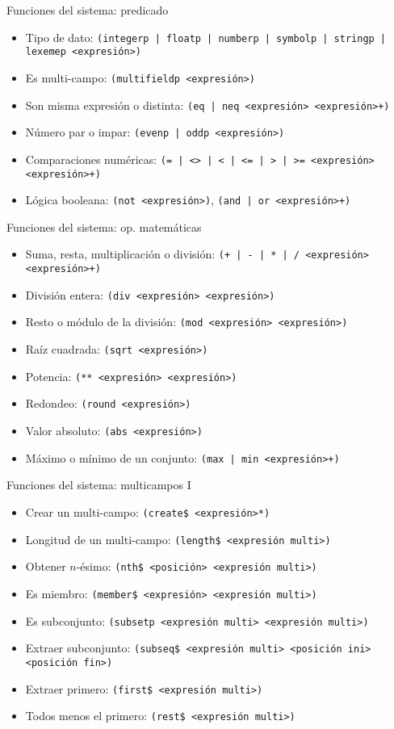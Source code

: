 \documentclass[usenames,dvipsnames,aspectratio=169]{beamer}
\begin{document}
\begin{frame}{Funciones del sistema: predicado}
	\begin{itemize}
		\item Tipo de dato: \texttt{(integerp | floatp | numberp | symbolp | stringp | lexemep <expresión>)}
		\item Es multi-campo: \texttt{(multifieldp <expresión>)}
		\item Son misma expresión o distinta: \texttt{(eq | neq <expresión> <expresión>+)}
		\item Número par o impar: \texttt{(evenp | oddp <expresión>)}
		\item Comparaciones numéricas: \texttt{(= | <> | < | <= | > | >= <expresión> <expresión>+)}
		\item Lógica booleana: \texttt{(not <expresión>)}, \texttt{(and | or <expresión>+)}
	\end{itemize}
\end{frame}

\begin{frame}{Funciones del sistema: op. matemáticas}
	\begin{itemize}
		\item Suma, resta, multiplicación o división: \texttt{(+ | - | * | / <expresión> <expresión>+)}
		\item División entera: \texttt{(div <expresión> <expresión>)}
		\item Resto o módulo de la división: \texttt{(mod <expresión> <expresión>)}
		\item Raíz cuadrada: \texttt{(sqrt <expresión>)}
		\item Potencia: \texttt{(** <expresión> <expresión>)}
		\item Redondeo: \texttt{(round <expresión>)}
		\item Valor absoluto: \texttt{(abs <expresión>)}
		\item Máximo o mínimo de un conjunto: \texttt{(max | min <expresión>+)}
	\end{itemize}
\end{frame}

\begin{frame}{Funciones del sistema: multicampos I}
	\begin{itemize}
		\item Crear un multi-campo: \texttt{(create\$ <expresión>*)}
		\item Longitud de un multi-campo: \texttt{(length\$ <expresión multi>)}
		\item Obtener $n$-ésimo: \texttt{(nth\$ <posición> <expresión multi>)}
		\item Es miembro: \texttt{(member\$ <expresión> <expresión multi>)}
		\item Es subconjunto: \texttt{(subsetp <expresión multi> <expresión multi>)}
		\item Extraer subconjunto: \texttt{(subseq\$ <expresión multi> <posición ini> <posición fin>)}
		\item Extraer primero: \texttt{(first\$ <expresión multi>)}
		\item Todos menos el primero: \texttt{(rest\$ <expresión multi>)}
	\end{itemize}
\end{frame}
\end{document}
